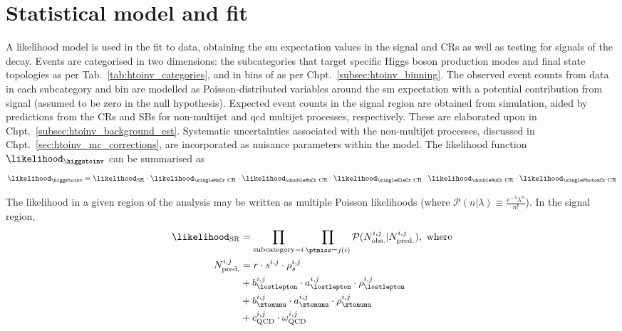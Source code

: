 \section{Statistical model and fit}
\label{sec:htoinv_satistical_treatment}

A likelihood model is used in the fit to data, obtaining the \acrlong{sm} expectation values in the signal and \glspl{CR} as well as testing for signals of the \higgstoinv decay. Events are categorised in two dimensions: the subcategories that target specific Higgs boson production modes and final state topologies as per Tab.~\ref{tab:htoinv_categories}, and in bins of \ptmiss as per Chpt.~\ref{subsec:htoinv_binning}. The observed event counts from data in each subcategory and \ptmiss bin are modelled as Poisson-distributed variables around the \acrshort{sm} expectation with a potential contribution from signal (assumed to be zero in the null hypothesis). Expected event counts in the signal region are obtained from simulation, aided by predictions from the \glspl{CR} and \glspl{SB} for non-multijet and \acrshort{qcd} multijet processes, respectively. These are elaborated upon in Chpt.~\ref{subsec:htoinv_background_est}. Systematic uncertainties associated with the non-multijet processes, discussed in Chpt.~\ref{sec:htoinv_mc_corrections}, are incorporated as nuisance parameters within the model. The likelihood function $\likelihood_{\higgstoinv}$ can be summarised as
\begin{equation}
    \likelihood_{\higgstoinv} = \likelihood_{\mathrm{SR}} \cdot \likelihood_{\text{\singleMuCr CR}} \cdot \likelihood_{\text{\doubleMuCr CR}} \cdot \likelihood_{\text{\singleEleCr CR}} \cdot \likelihood_{\text{\doubleMuCr CR}} \cdot \likelihood_{\text{\singlePhotonCr CR}}
    \label{eq:likelihood_overall}
\end{equation}

The likelihood in a given region of the analysis may be written as multiple Poisson likelihoods (where $\mathcal{P}(n | \lambda) \equiv \frac{ e^{-\lambda} \lambda^n }{n!}$). In the signal region,
\begin{equation}
    \begin{aligned}
\likelihood_{\mathrm{SR}} &= \prod_{\mathrm{subcategory} = i} \prod_{\ptmiss = j(i)} \mathcal{P}(N_{\mathrm{obs.}}^{i, j} | N_{\mathrm{pred.}}^{i, j}), \ \text{where}\\
N_{\mathrm{pred.}}^{i, j} &= r \cdot s^{i, j} \cdot \rho_s^{i, j}\\
&+ b_{\lostlepton}^{i, j} \cdot a_{\lostlepton}^{i, j} \cdot \rho_{\lostlepton}^{i, j}\\
&+ b_{\ztonunu}^{i, j} \cdot a_{\ztonunu}^{i, j} \cdot \rho_{\ztonunu}^{i, j}\\
&+ c_{\mathrm{QCD}}^{i, j} \cdot \omega_{\mathrm{QCD}}^{i, j}
    \end{aligned}
    \label{eq:likelihood_SR}
\end{equation}

